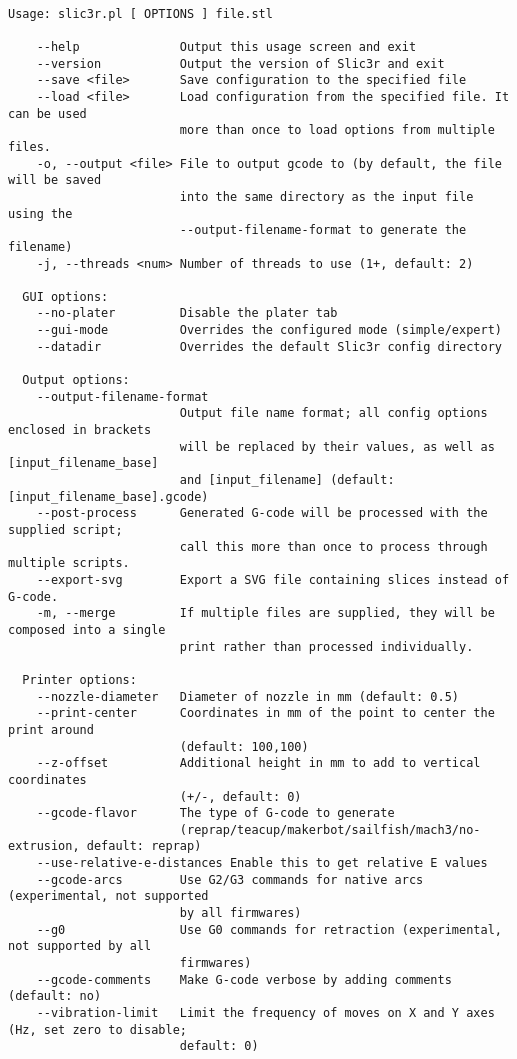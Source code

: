 \tiny
\begin{verbatim}

Usage: slic3r.pl [ OPTIONS ] file.stl

    --help              Output this usage screen and exit
    --version           Output the version of Slic3r and exit
    --save <file>       Save configuration to the specified file
    --load <file>       Load configuration from the specified file. It can be used
                        more than once to load options from multiple files.
    -o, --output <file> File to output gcode to (by default, the file will be saved
                        into the same directory as the input file using the
                        --output-filename-format to generate the filename)
    -j, --threads <num> Number of threads to use (1+, default: 2)

  GUI options:
    --no-plater         Disable the plater tab
    --gui-mode          Overrides the configured mode (simple/expert)
    --datadir           Overrides the default Slic3r config directory

  Output options:
    --output-filename-format
                        Output file name format; all config options enclosed in brackets
                        will be replaced by their values, as well as [input_filename_base]
                        and [input_filename] (default: [input_filename_base].gcode)
    --post-process      Generated G-code will be processed with the supplied script;
                        call this more than once to process through multiple scripts.
    --export-svg        Export a SVG file containing slices instead of G-code.
    -m, --merge         If multiple files are supplied, they will be composed into a single
                        print rather than processed individually.

  Printer options:
    --nozzle-diameter   Diameter of nozzle in mm (default: 0.5)
    --print-center      Coordinates in mm of the point to center the print around
                        (default: 100,100)
    --z-offset          Additional height in mm to add to vertical coordinates
                        (+/-, default: 0)
    --gcode-flavor      The type of G-code to generate 
                        (reprap/teacup/makerbot/sailfish/mach3/no-extrusion, default: reprap)
    --use-relative-e-distances Enable this to get relative E values
    --gcode-arcs        Use G2/G3 commands for native arcs (experimental, not supported
                        by all firmwares)
    --g0                Use G0 commands for retraction (experimental, not supported by all
                        firmwares)
    --gcode-comments    Make G-code verbose by adding comments (default: no)
    --vibration-limit   Limit the frequency of moves on X and Y axes (Hz, set zero to disable;
                        default: 0)


\end{verbatim}
